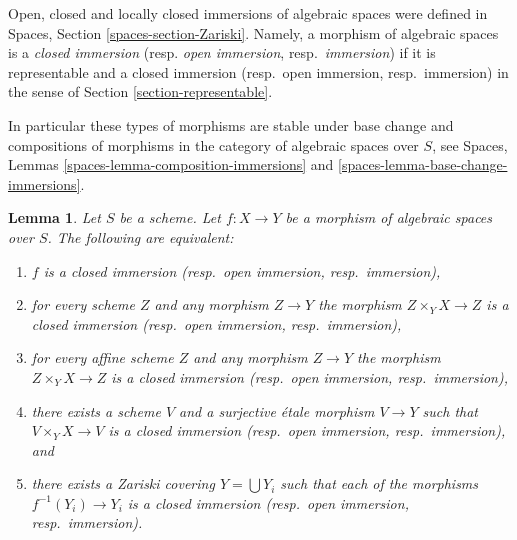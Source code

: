\documentclass{stacks-project}
\theoremstyle{plain}
\newtheorem{lemma}[subsection]{Lemma}
\theoremstyle{definition}
\theoremstyle{remark}
\numberwithin{equation}{subsection}
\begin{document}
\noindent
Open, closed and locally closed immersions of algebraic spaces were defined in
Spaces, Section \ref{spaces-section-Zariski}.
Namely, a morphism of algebraic spaces is a
{\it closed immersion} (resp. {\it open immersion}, resp.\ {\it immersion})
if it is representable and a closed immersion (resp.\ open immersion,
resp.\ immersion) in the sense of Section \ref{section-representable}.

\medskip\noindent
In particular these types of morphisms are stable under base change
and compositions of morphisms in the category of algebraic
spaces over $S$, see
Spaces, Lemmas \ref{spaces-lemma-composition-immersions} and
\ref{spaces-lemma-base-change-immersions}.

\begin{lemma}
\label{lemma-closed-immersion-local}
Let $S$ be a scheme. Let $f : X \to Y$ be a morphism of algebraic spaces
over $S$. The following are equivalent:
\begin{enumerate}
\item $f$ is a closed immersion (resp.\ open immersion, resp.\ immersion),
\item for every scheme $Z$ and any morphism $Z \to Y$ the morphism
$Z \times_Y X \to Z$ is a closed immersion (resp.\ open immersion,
resp.\ immersion),
\item for every affine scheme $Z$ and any morphism
$Z \to Y$ the morphism $Z \times_Y X \to Z$ is a closed immersion
(resp.\ open immersion, resp.\ immersion),
\item there exists a scheme $V$ and a surjective \'etale morphism
$V \to Y$ such that $V \times_Y X \to V$ is a closed immersion
(resp.\ open immersion, resp.\ immersion), and
\item there exists a Zariski covering $Y = \bigcup Y_i$ such that
each of the morphisms $f^{-1}(Y_i) \to Y_i$ is a closed immersion
(resp.\ open immersion, resp.\ immersion).
\end{enumerate}
\end{lemma}
\end{document}
